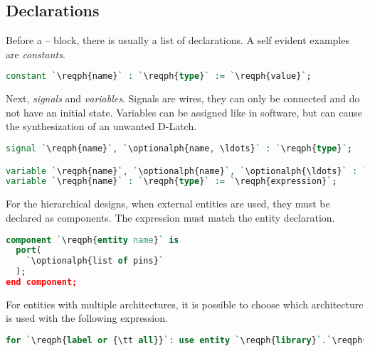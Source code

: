 \subsection{Declarations} \label{sec:vhdl:declarations}
Before a  --  block, there is usually a list of declarations.
A self evident examples are \emph{constants}.
\begin{lstlisting}[language=vhdl]
constant `\reqph{name}` : `\reqph{type}` := `\reqph{value}`;
\end{lstlisting}

Next, \emph{signals} and \emph{variables}. Signals are wires, they can only be
connected and do not have an initial state. Variables can be assigned like in
software, but can cause the synthesization of an unwanted D-Latch.

\begin{lstlisting}[language=vhdl]
signal `\reqph{name}`, `\optionalph{name, \ldots}` : `\reqph{type}`;

variable `\reqph{name}`, `\optionalph{name}`, `\optionalph{\ldots}` : `\reqph{type}`;
variable `\reqph{name}` : `\reqph{type}` := `\reqph{expression}`;
\end{lstlisting}

For the hierarchical designs, when external entities are used, they must be
declared as components. The  expression must match the entity
declaration.
\begin{lstlisting}[language=vhdl]
component `\reqph{entity name}` is
  port(
    `\optionalph{list of pins}`
  );
end component;
\end{lstlisting}
For entities with multiple architectures, it is possible to choose which
architecture is used with the following expression.
\begin{lstlisting}[language=vhdl]
for `\reqph{label or {\tt all}}`: use entity `\reqph{library}`.`\reqph{entity}`(`\reqph{architecture}`);
\end{lstlisting}

